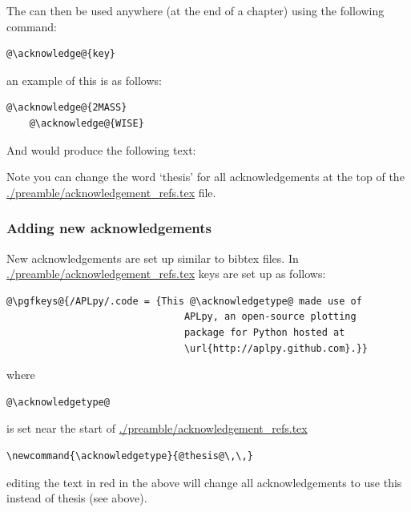     The can then be used anywhere (\ie at the end of a chapter) using the following command: 

    \begin{lstlisting}[style=base]
    @\acknowledge@{key}
    \end{lstlisting}

    an example of this is as follows:

    \begin{lstlisting}[style=base]
    @\acknowledge@{2MASS}
    @\acknowledge@{WISE}
    \end{lstlisting}

    And would produce the following text: \\



    Note you can change the word `thesis' for all acknowledgements at the top of the \url{./preamble/acknowledgement_refs.tex} file.

    \subsubsection{Adding new acknowledgements}

    New acknowledgements are set up similar to bibtex files. In \url{./preamble/acknowledgement_refs.tex} keys are set up as follows:

    \begin{lstlisting}[style=base]
    @\pgfkeys@{/APLpy/.code = {This @\acknowledgetype@ made use of 
                               APLpy, an open-source plotting 
                               package for Python hosted at 
                               \url{http://aplpy.github.com}.}}
    \end{lstlisting}

    \noindent where
    \begin{lstlisting}[style=base]
    @\acknowledgetype@
    \end{lstlisting}

    \noindent is set near the start of \url{./preamble/acknowledgement_refs.tex}

    \begin{lstlisting}[style=base]
    \newcommand{\acknowledgetype}{@thesis@\,\,}
    \end{lstlisting}

    \noindent editing the text in red in the above will change all acknowledgements to use this instead of thesis (see above).



